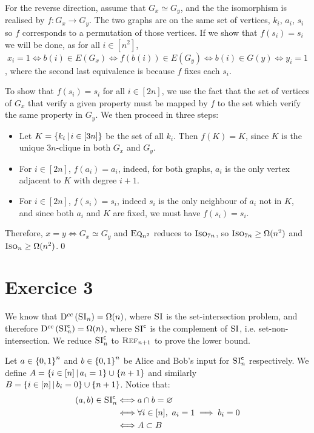     For the reverse direction, assume that $G_x \simeq G_y$,
    and the the isomorphism is realised by $f: G_x \to G_y$.
    The two graphs are on the same set of vertices, $k_i$, $a_i$, $s_i$ 
    so $f$ corresponds to a permutation of those vertices.
    If we show that $f(s_i) = s_i$
    we will be done, as for all $i \in [n^2]$, 
    \[
        x_i = 1 \iff b(i) \in E(G_x) \iff f(b(i)) \in E(G_y)
        \iff b(i) \in G(y) \iff y_i = 1
    \],
    where the second last equivalence is because $f$ fixes each $s_i$.

    To show that $f(s_i) = s_i$ for all $i \in [2n]$, we use
    the fact that the set of vertices of $G_x$ that verify a given property
    must be mapped by $f$ to the set which verify the same
    property in $G_y$.
    We then proceed in three steps:
    \begin{itemize}
        \item Let $K = \left\{ k_i \, \middle| \, i \in [3n] \right\}$ be the set of all $k_i$.
            Then $f(K) = K$, since $K$ is the unique $3n$-clique in both $G_x$
            and $G_y$.
        \item For $i \in [2n]$, $f(a_i) = a_i$, indeed, for both graphs,
            $a_i$ is the only vertex adjacent to $K$ with degree $i + 1$.
        \item For $i \in [2n]$, $f(s_i) = s_i$, indeed $s_i$ is the only
            neighbour of $a_i$ not in $K$, and since both $a_i$ and $K$
            are fixed, we must have $f(s_i) = s_i$.
    \end{itemize}

    Therefore, $x = y \iff G_x \simeq G_y$ and $\textsc{Eq}_{n^2}$ reduces to $\textsc{Iso}_{7n}$,
    so $\textsc{Iso}_{7n} \geq \Omega(n^2)$ and $\textsc{Iso}_n \geq \Omega(n^2)$.\qed
    

    \section*{Exercice 3}
    We know that $\mathrm{D}^{cc}\left(\textsc{SI}_n\right) = \Omega(n)$, where $\textsc{SI}$ is
    the set-intersection problem,
    and therefore $\mathrm{D}^{cc}\left(\textsc{SI}^\mathsf{c}_n\right) = \Omega(n)$,
    where $\textsc{SI}^\mathsf{c}$ is the complement of $\textsc{SI}$,
    i.e. set-non-intersection.
    We reduce $\textsc{SI}^\mathsf{c}_n$ to $\textsc{Ref}_{n+1}$ to prove the lower bound.

    Let $a \in \left\{ 0, 1 \right\}^n$ and $b \in \left\{ 0, 1 \right\}^n$ be Alice and Bob's input
    for $\textsc{SI}^\mathsf{c}_n$ respectively.
    We define $A = \left\{ i \in [n] \, \middle| \, a_i = 1 \right\} \cup \left\{ n + 1 \right\}$
    and similarly $B = \left\{ i \in [n] \, \middle| \, b_i = 0 \right\} \cup \left\{ n + 1 \right\}$.
    Notice that:
    \begin{align*}
        (a, b) \in \textsc{SI}^\mathsf{c}_n 
        &\Longleftrightarrow a \cap b = \varnothing 
        \\& \Longleftrightarrow \forall i \in [n],~ a_i = 1 \implies b_i = 0
        \\& \Longleftrightarrow A \subset B
    \end{align*}


